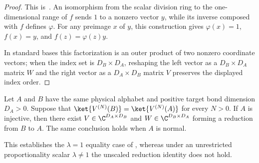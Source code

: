 \begin{proof}
    \leanok
    This is~\cite[``Rank-one factorizations'']{QICLean2026Blueprint}.
    An isomorphism from the scalar division ring to the one-dimensional range
    of $f$ sends $1$ to a nonzero vector $y$, while its inverse composed with
    $f$ defines $\varphi$.  For any preimage $x$ of $y$, this construction
    gives $\varphi(x)=1$, $f(x)=y$, and $f(z)=\varphi(z)y$.

    In standard bases this factorization is an outer product of two nonzero
    coordinate vectors; when the index set is $D_B\times D_A$, reshaping the
    left vector as a $D_B\times D_A$ matrix $W$ and the right vector as a
    $D_A\times D_B$ matrix $V$ preserves the displayed index order.
\end{proof}


\begin{lemma}
    \label{thm:mps_equality_reduction_exists}
    \leanok
    Let $A$ and $B$ have the same physical alphabet and positive target bond
    dimension $D_A>0$.  Suppose that
    $\ket{V^{(N)}(B)}=\ket{V^{(N)}(A)}$ for every $N>0$.
    If $A$ is injective, then there exist
    $V\in\C^{D_A\times D_B}$ and $W\in\C^{D_B\times D_A}$ forming a
    reduction from $B$ to $A$.  The same conclusion holds when $A$ is normal.

    This establishes the $\lambda=1$ equality case of
    \cite[Proposition~20, lines~3815--3938]{Molnar2018SemiInjective}, whereas
    under an unrestricted proportionality scalar $\lambda\neq1$
    \cite{gap:mgsc18_reduction_proportionality_scalar} the unscaled reduction
    identity does not hold.
\end{lemma}

